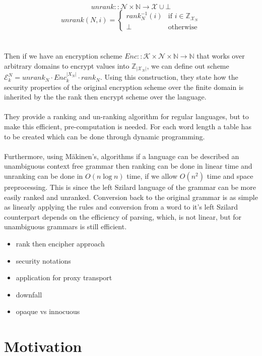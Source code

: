 \documentclass[12pt,a4paper]{article}
\begin{document}
$$ unrank :: \mathcal{N} \times \mathbb{N} \rightarrow \mathcal{X} \cup \bot $$
$$ unrank(N,i) =
\left\{
	\begin{array}{ll}
		rank_N^{-1}(i)  & \mbox{if } i \in \mathbb{Z}_{\mathcal{X}_N}\\
		\bot & \mbox{otherwise} 
	\end{array}
\right.
$$\\\\
Then if we have an encryption scheme $Enc :: \mathcal{K} \times \mathcal{N} \times \mathbb{N} \rightarrow \mathbb{N}$ that works over arbitrary domains to encrypt values into $\mathbb{Z}_{|\mathcal{X}_N|}$, we can define out scheme $\mathcal{E}_k^N = unrank_N \cdot Enc_k^{|X_N|} \cdot rank_N$. Using this construction, they state how the security properties of the original encryption scheme over the finite domain is inherited by the the rank then encrypt scheme over the language.
\\\\
They provide a ranking and un-ranking algorithm for regular languages, but to make this efficient, pre-computation is needed. For each word length a table has to be created which can be done through dynamic programming.
\\\\
Furthermore, using M\"akinen's\cite{rankcf}, algorithms if a language can be described an unambiguous context free grammar then ranking can be done in linear time and unranking can be done in $O(n \log n)$ time, if we allow $O(n^2)$ time and space preprocessing. This is since the left Szilard language of the grammar can be more easily ranked and unranked. Conversion back to the original grammar is as simple as linearly applying the rules and conversion from a word to it's left Szilard counterpart depends on the efficiency of parsing, which, is not linear, but for unambiguous grammars is still efficient.

\begin{itemize}
 \item rank then encipher approach
 \item security notations
 \item application for proxy transport
 \item downfall
 \item opaque vs innocuous
\end{itemize}

\pagebreak
\section{Motivation}
\end{document}
